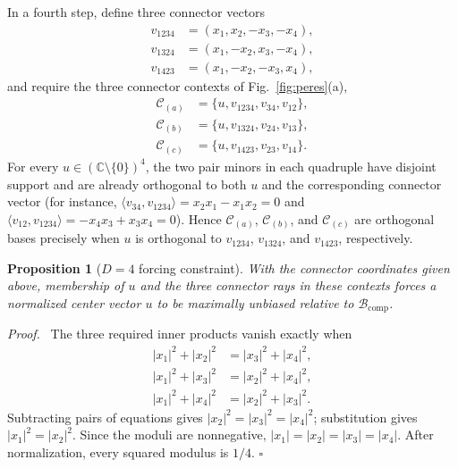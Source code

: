 \documentclass[%
  reprint,
  superscriptaddress,
  showkeys,
  amsmath,amssymb,
  aps,pra,
  longbibliography,
  floatfix,
  x11names
]{revtex4-2}
\newtheorem{proposition}{Proposition}
\newenvironment{proof}{\par\noindent\textit{Proof.}\ }{\hfill$\square$\par}
\begin{document}
In a fourth step, define three connector vectors
\begin{align*}
v_{1234}&=(x_1,x_2,-x_3,-x_4),\\
v_{1324}&=(x_1,-x_2,x_3,-x_4),\\
v_{1423}&=(x_1,-x_2,-x_3,x_4),
\end{align*}
and require the three connector contexts of Fig.~\ref{fig:peres}(a),
\begin{align*}
\mathcal{C}_{(a)}&=\{u,v_{1234},v_{34},v_{12}\},\\
\mathcal{C}_{(b)}&=\{u,v_{1324},v_{24},v_{13}\},\\
\mathcal{C}_{(c)}&=\{u,v_{1423},v_{23},v_{14}\}.
\end{align*}
For every $u\in(\mathbb{C}\setminus\{0\})^4$, the two pair minors in each quadruple have disjoint support and are already orthogonal to both $u$ and the corresponding connector vector (for instance, $\langle v_{34},v_{1234}\rangle=x_2x_1-x_1x_2=0$ and $\langle v_{12},v_{1234}\rangle=-x_4x_3+x_3x_4=0$).  Hence $\mathcal{C}_{(a)}$, $\mathcal{C}_{(b)}$, and $\mathcal{C}_{(c)}$ are orthogonal bases precisely when $u$ is orthogonal to $v_{1234}$, $v_{1324}$, and $v_{1423}$, respectively.

\begin{proposition}[$D=4$ forcing constraint]
\label{prop:D4forcing}
With the connector coordinates given above, membership of $u$ and the three connector rays in these contexts forces a normalized center vector $u$ to be maximally unbiased relative to $\mathcal{B}_{\mathrm{comp}}$.
\end{proposition}

\begin{proof}
The three required inner products vanish exactly when
\begin{align}
|x_1|^2+|x_2|^2&=|x_3|^2+|x_4|^2, \label{eq:D4a}\\
|x_1|^2+|x_3|^2&=|x_2|^2+|x_4|^2, \label{eq:D4b}\\
|x_1|^2+|x_4|^2&=|x_2|^2+|x_3|^2. \label{eq:D4c}
\end{align}
Subtracting pairs of equations gives $|x_2|^2=|x_3|^2=|x_4|^2$; substitution gives $|x_1|^2=|x_2|^2$.  Since the moduli are nonnegative, \ensuremath{|x_1|=|x_2|=|x_3|=|x_4|}.  After normalization, every squared modulus is $1/4$.
\end{proof}
\end{document}
